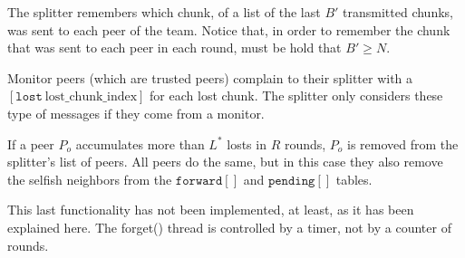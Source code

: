 
\label{sec:free_riding_control}

The splitter remembers which chunk, of a list of the last $B'$
transmitted chunks, was sent to each peer of the team. Notice that, in
order to remember the chunk that was sent to each peer in each round,
must be hold that $B'\ge N$. 

Monitor peers (which are trusted peers) complain to their splitter
with a $[\mathtt{lost}~\text{lost\_chunk\_index}]$ for each lost
chunk. The splitter only considers these type of messages if they come
from a monitor.

If a peer $P_o$ accumulates more than $L^*$ losts in $R$ rounds, $P_o$
is removed from the splitter's list of peers. All peers do the same,
but in this case they also remove the selfish neighbors from the
$\mathtt{forward}[]$ and $\mathtt{pending}[]$ tables.


\begin{notex}
This last functionality has not been implemented, at least, as it has
been explained here. The forget() thread is controlled by a timer, not
by a counter of rounds.
\end{notex}

